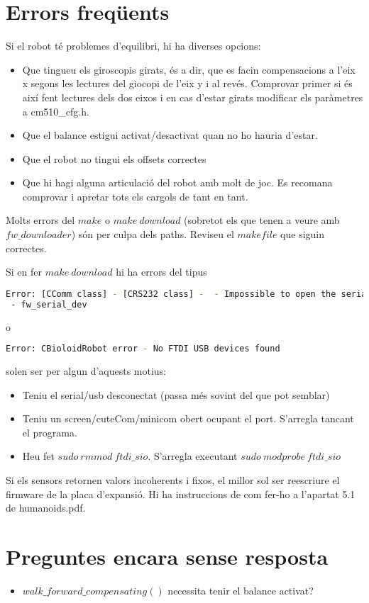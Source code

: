 \documentclass{article}
\begin{document}
\section{Errors freqüents}
Si el robot té problemes d'equilibri, hi ha diverses opcions:
\begin{itemize}
	\item Que tingueu els giroscopis girats, és a dir, que es facin compensacions a l'eix x segons les lectures del giocopi de l'eix y i al revés. Comprovar primer si és així fent lectures dels dos eixos i en cas d'estar girats modificar els paràmetres a cm510\_cfg.h.
	\item Que el balance estigui activat/desactivat quan no ho hauria d'estar.
	\item Que el robot no tingui els offsets correctes
	\item Que hi hagi alguna articulació del robot amb molt de joc. Es recomana comprovar i apretar tots els cargols de tant en tant.
\end{itemize}

Molts errors del $make$ o $make\ download$ (sobretot els que tenen a veure amb $fw\_downloader$) són per culpa dels paths. Reviseu el $makefile$ que siguin correctes. 

Si en fer $make\ download$ hi ha errors del tipus
\begin{lstlisting}[language=bash]
Error: [CComm class] - [CRS232 class] -  - Impossible to open the serial port.
 - fw_serial_dev
\end{lstlisting} 
o
\begin{lstlisting}[language=bash]
Error: CBioloidRobot error - No FTDI USB devices found
\end{lstlisting} 
solen ser per algun d'aquests motius:
\begin{itemize}
	\item Teniu el serial/usb desconectat (passa més sovint del que pot semblar)
	\item Teniu un screen/cuteCom/minicom obert ocupant el port. S'arregla tancant el programa.
	\item Heu fet $sudo\ rmmod\ ftdi\_sio$. S'arregla executant $sudo\ modprobe\ ftdi\_sio$
	\end{itemize}

Si els sensors retornen valors incoherents i fixos, el millor sol ser reescriure el firmware de la placa d'expansió. Hi ha instruccions de com fer-ho a l'apartat 5.1 de humanoids.pdf.

\section{Preguntes encara sense resposta}
\begin{itemize}
	\item $walk\_forward\_compensating()$ necessita tenir el balance activat?
\end{itemize}
\end{document}
